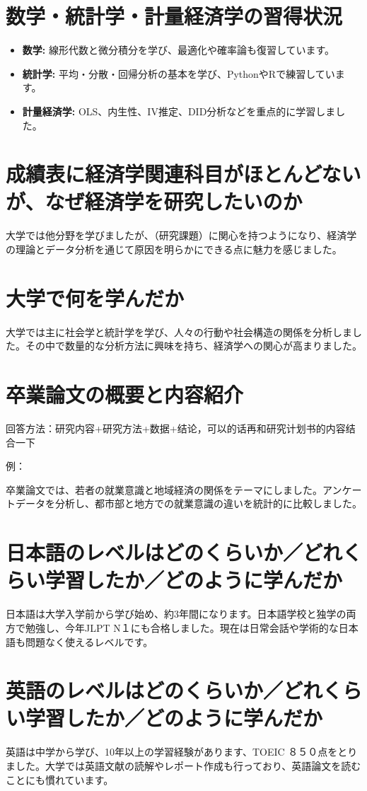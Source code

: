\documentclass[xelatex,a4paper,base=11pt,ja=standard,jafont=noto]{bxjsreport}
\begin{document}
\section{数学・統計学・計量経済学の習得状況}
\begin{itemize}
    \item \textbf{数学:} 線形代数と微分積分を学び、最適化や確率論も復習しています。
    \item \textbf{統計学:} 平均・分散・回帰分析の基本を学び、PythonやRで練習しています。
    \item \textbf{計量経済学:} OLS、内生性、IV推定、DID分析などを重点的に学習しました。
\end{itemize}
\section{成績表に経済学関連科目がほとんどないが、なぜ経済学を研究したいのか}
大学では他分野を学びましたが、（研究課題）に関心を持つようになり、経済学の理論とデータ分析を通じて原因を明らかにできる点に魅力を感じました。
\section{大学で何を学んだか}
大学では主に社会学と統計学を学び、人々の行動や社会構造の関係を分析しました。その中で数量的な分析方法に興味を持ち、経済学への関心が高まりました。
\section{卒業論文の概要と内容紹介}
回答方法：研究内容+研究方法+数据+结论，可以的话再和研究计划书的内容结合一下
\par 例：
\par 卒業論文では、若者の就業意識と地域経済の関係をテーマにしました。アンケートデータを分析し、都市部と地方での就業意識の違いを統計的に比較しました。
\section{日本語のレベルはどのくらいか／どれくらい学習したか／どのように学んだか}
日本語は大学入学前から学び始め、約3年間になります。日本語学校と独学の両方で勉強し、今年JLPT N１にも合格しました。現在は日常会話や学術的な日本語も問題なく使えるレベルです。
\section{英語のレベルはどのくらいか／どれくらい学習したか／どのように学んだか}
英語は中学から学び、10年以上の学習経験があります、TOEIC ８５０点をとりました。大学では英語文献の読解やレポート作成も行っており、英語論文を読むことにも慣れています。
\end{document}
